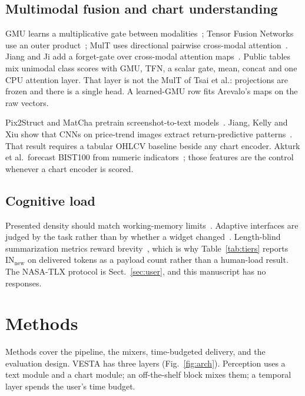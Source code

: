 \documentclass{llncs}
\begin{document}
\subsection{Multimodal fusion and chart understanding}
GMU learns a multiplicative gate between modalities~\cite{arevalo2017gmu}; Tensor Fusion Networks use an outer product~\cite{zadeh2017tfn}; MulT uses directional pairwise cross-modal attention~\cite{tsai2019mult}. Jiang and Ji add a forget-gate over cross-modal attention maps~\cite{jiang2022cmga}. Public tables mix unimodal class scores with GMU, TFN, a scalar gate, mean, concat and one CPU attention layer. That layer is not the MulT of Tsai et al.: projections are frozen and there is a single head. A learned-GMU row fits Arevalo's maps on the raw vectors.

Pix2Struct and MatCha pretrain screenshot-to-text models~\cite{lee2023pix2struct,liu2023matcha}. Jiang, Kelly and Xiu show that CNNs on price-trend images extract return-predictive patterns~\cite{jiang2023reimagining}. That result requires a tabular OHLCV baseline beside any chart encoder. Akturk et al.\ forecast BIST100 from numeric indicators~\cite{akturk2026bist}; those features are the control whenever a chart encoder is scored.

\subsection{Cognitive load}
Presented density should match working-memory limits~\cite{sweller1988cognitive,sweller2023clt,miller1956magical,eppler2004overload}. Adaptive interfaces are judged by the task rather than by whether a widget changed~\cite{gajos2006exploring,findlater2009adaptive}. Length-blind summarization metrics reward brevity~\cite{sun2019compare}, which is why Table~\ref{tab:tiers} reports $\mathrm{IN}_{\mathrm{new}}$ on delivered tokens as a payload count rather than a human-load result. The NASA-TLX protocol is Sect.~\ref{sec:user}, and this manuscript has no responses.

\section{Methods}
\label{sec:methods}
Methods cover the pipeline, the mixers, time-budgeted delivery, and the evaluation design. VESTA has three layers (Fig.~\ref{fig:arch}). Perception uses a text module and a chart module; an off-the-shelf block mixes them; a temporal layer spends the user's time budget.
\end{document}
